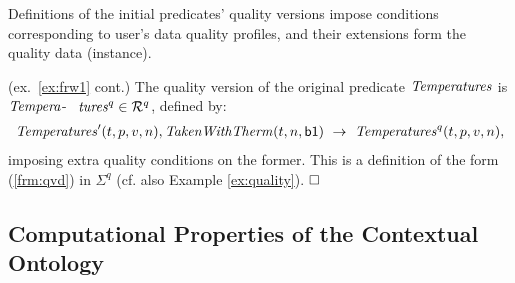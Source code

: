 \documentclass[format=acmsmall, review=false, screen=true]{acmart}
\newcommand{\ignore}[1]{}
\newcommand{\boxtheorem}{\ensuremath{\hfill \Box}}
\newcommand{\mc}[1]{\mathcal{ #1}}
\newcommand{\nit}[1]{{\it #1}}
\newcommand{\bl}[1]{#1}
\newcommand{\schema}{\mc{R}}
\newcommand{\omd}{OMD}
\newcommand{\red}[1]{{#1}}
\newcommand{\blue}[1]{{#1}}
\newcommand{\comlb}[1]{{\vspace{2mm}\noindent \bf \blue{COMM(LEO):}}~ #1 \hfill {\bf
    END.}\\}
\newcommand{\commos}[1]{{\vspace{2mm}\noindent \bf \blue{COMM(MOSTAFA):}}~ #1 \hfill {\bf
    END.}\\}
\begin{document}
Definitions of the initial predicates' quality versions impose conditions corresponding to user's data quality profiles, and their extensions form the quality data (instance).

\begin{example} \label{ex:framework} (ex.~\ref{ex:frw1} cont.) The quality version of the original predicate $\nit{Temperatures}$ is ${\it Tempera}$- \ ${\it tures}^q \in \schema^q$,  defined by:
\begin{align}
{\it Temperatures}'(t,p,v,n),{\it TakenWithTherm}(t,n,{\sf b1}) ~\rightarrow~ {\it Temperatures}^q(t,p,v,n),\label{frm:expm3}
\end{align}
imposing extra quality conditions on the former. This is a definition of the form (\ref{frm:qvd}) in $\Sigma^q$ (cf. also Example \ref{ex:quality}).
\boxtheorem\end{example}



\ignore{
Notice that the connection between the quality versions in $\mc{R}^q$, categorical relations in $\mc{O}^\mc{M}$, and contextual relations in \bl{$E$} is through quality predicates $\mc{P}$\red{. Since} the latter are defined by general and flexible rules, through \red{them we can also} access the ontology $\mc{O}^\mc{M}$ and the contextual instance \bl{$E$}.

The external sources $\mc{E}=\{E_1,...,E_j\}$ are of different types and contribute with data to the contextual schema. These data can be materialized and stored at the context level by the contextual instance \bl{$E$}, or left at the sources and accessed through mappings. }

\subsection{Computational Properties of the Contextual Ontology}\label{sec:ext}

\ignore{\comlb{PLEASE REVISE THIS SECTION. MAYBE SHORTEN TOO.}

\comlb{We have to say something short about the preservation of good computational properties of the \omd context when extra things are added (we had something in the thesis). Actually, it is better that we summarize here the assumptions about the extra rules, to make the algorithm in the next section more clear.}

\comlb{I brought here what was at the end of the next section. Better dispatch this subject here.}

\commos{I modified the part in blue to explain the assumptions and the effect of them.}   }
\end{document}
